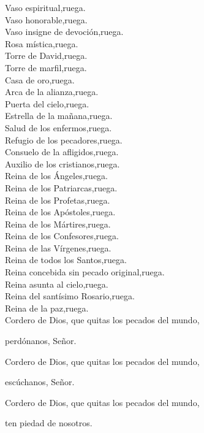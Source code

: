 Vaso espiritual,\hfill ruega.\\
Vaso honorable,\hfill ruega.\\
Vaso insigne de devoción,\hfill ruega.\\
Rosa mística,\hfill ruega.\\
Torre de David,\hfill ruega.\\
Torre de marfil,\hfill ruega.\\
Casa de oro,\hfill ruega.\\
Arca de la alianza,\hfill ruega.\\
Puerta del cielo,\hfill ruega.\\
Estrella de la mañana,\hfill ruega.\\
Salud de los enfermos,\hfill ruega.\\
Refugio de los pecadores,\hfill ruega.\\
Consuelo de la afligidos,\hfill ruega.\\
Auxilio de los cristianos,\hfill ruega.\\
Reina de los Ángeles,\hfill ruega.\\
Reina de los Patriarcas,\hfill ruega.\\
Reina de los Profetas,\hfill ruega.\\
Reina de los Apóstoles,\hfill ruega.\\
Reina de los Mártires,\hfill ruega.\\
Reina de los Confesores,\hfill ruega.\\
Reina de las Vírgenes,\hfill ruega.\\
Reina de todos los Santos,\hfill ruega.\\
Reina concebida sin pecado original,\hfill ruega.\\
Reina asunta al cielo,\hfill ruega.\\
Reina del santísimo Rosario,\hfill ruega.\\
Reina de la paz,\hfill ruega.\\
Cordero de Dios, que quitas los pecados del mundo,

\hfill perdónanos, Señor.

Cordero de Dios, que quitas los pecados del mundo,

\hfill escúchanos, Señor.

Cordero de Dios, que quitas los pecados del mundo,

\hfill ten piedad de nosotros.

